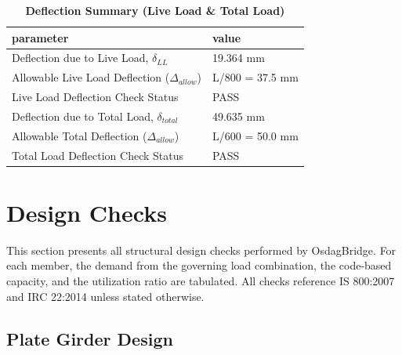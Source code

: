 \documentclass[12pt,a4paper]{report}
\numberwithin{table}{chapter}
\numberwithin{figure}{chapter}
\begin{document}
\vspace{1em}
\begin{longtable}{|L{7cm}|p{8.5cm}|}
\caption{\textbf{Deflection Summary (Live Load \& Total Load)}}
\hline
\textbf{parameter} & \textbf{value} \\
\hline
\textnormal{Deflection due to Live Load, $\delta_{LL}$} & 19.364 mm \\[6pt]
\hline
\textnormal{Allowable Live Load Deflection ($\Delta_{allow}$)} & L/800 = 37.5 mm \\[6pt]
\hline
\textnormal{Live Load Deflection Check Status} & PASS \\[6pt]
\hline
\textnormal{Deflection due to Total Load, $\delta_{total}$} & 49.635 mm \\[6pt]
\hline
\textnormal{Allowable Total Deflection ($\Delta_{allow}$)} & L/600 = 50.0 mm \\[6pt]
\hline
\textnormal{Total Load Deflection Check Status} & PASS \\[6pt]
\hline
\end{longtable}

\vspace{1em}
\noindent
\noindent{}
\noindent{}
\noindent{}


\chapter{Design Checks}

This section presents all structural design checks performed by OsdagBridge. For each member, the demand from the governing load combination, the code-based capacity, and the utilization ratio are tabulated. All checks reference IS 800:2007 and IRC 22:2014 unless stated otherwise.

\section{Plate Girder Design}
\label{sec:plate-girder}
\end{document}
